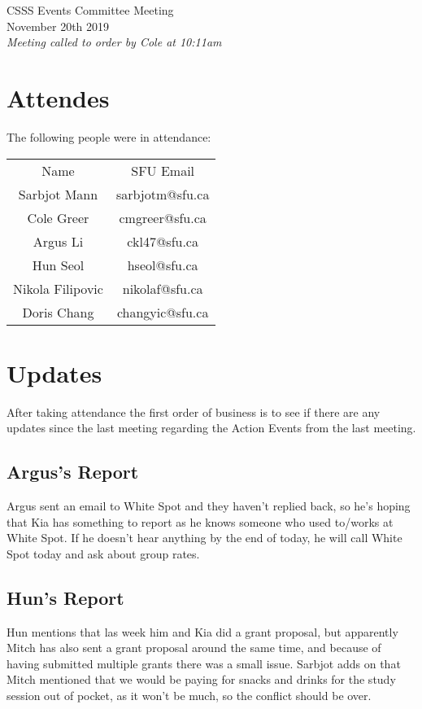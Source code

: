 \documentclass[12pt]{article}
\begin{document}
\begin{center}
CSSS Events Committee Meeting \\
November 20th 2019 \\
\em Meeting called to order by Cole at 10:11am
\end{center}
\tableofcontents
\thispagestyle{empty}
\clearpage
{} 

\newpage 
\section{Attendes} \label{sec:Introduction}
The following people were in attendance: 
\begin{table}[h]
\centering
\begin{tabular}{cc}
Name                   & SFU Email             \\
Sarbjot Mann           & sarbjotm@sfu.ca       \\
Cole Greer             & cmgreer@sfu.ca        \\
Argus Li               & ckl47@sfu.ca          \\
Hun Seol               & hseol@sfu.ca          \\
Nikola Filipovic  & nikolaf@sfu.ca  \\
Doris Chang            & changyic@sfu.ca      

\end{tabular}
\end{table}

\section{Updates} \label{sec:Updates}

\noindent After taking attendance the first order of business is to see if there are any updates since the last meeting regarding the Action Events from the last meeting.

\subsection{Argus's Report}
\noindent Argus sent an email to White Spot and they haven't replied back, so he's hoping that Kia has something to report as he knows someone who used to/works at White Spot. If he doesn't hear anything by the end of today, he will call White Spot today and ask about group rates. 


\subsection{Hun's Report}
\noindent Hun mentions that las week him and Kia did a grant proposal, but apparently Mitch has also sent a grant proposal around the same time, and because of having submitted multiple grants there was a small issue. Sarbjot adds on that Mitch mentioned that we would be paying for snacks and drinks for the study session out of pocket, as it won't be much, so the conflict should be over. 
\end{document}
